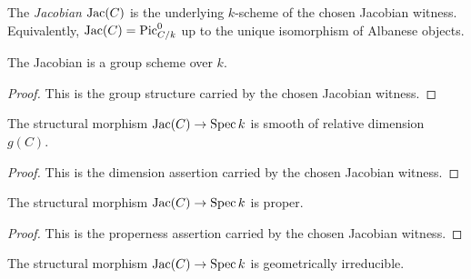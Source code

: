 \begin{definition}[Jacobian]
  \label{mk-def:Jacobian}

  The \emph{Jacobian} \(\mathrm{Jac}(C)\) is the underlying \(k\)-scheme of the
  chosen Jacobian witness.  Equivalently, \(\mathrm{Jac}(C)=\operatorname{Pic}^0_{C/k}\) up to the
  unique isomorphism of Albanese objects.
\end{definition}

\begin{theorem}
  \label{mk-thm:Jacobian_grpObj}

  The Jacobian is a group scheme over \(k\).
\end{theorem}

\begin{proof}
  This is the group structure carried by the chosen Jacobian witness.
\end{proof}

\begin{theorem}
  \label{mk-thm:Jacobian_smooth_genus}

  The structural morphism \(\mathrm{Jac}(C)\to\operatorname{Spec} k\) is smooth of relative
  dimension \(g(C)\).
\end{theorem}

\begin{proof}
  This is the dimension assertion carried by the chosen Jacobian witness.
\end{proof}

\begin{theorem}[Properness]
  \label{mk-thm:Jacobian_proper}

  The structural morphism \(\mathrm{Jac}(C)\to\operatorname{Spec} k\) is proper.
\end{theorem}

\begin{proof}
  This is the properness assertion carried by the chosen Jacobian witness.
\end{proof}

\begin{theorem}
  \label{mk-thm:Jacobian_geomIrred}

  The structural morphism \(\mathrm{Jac}(C)\to\operatorname{Spec} k\) is geometrically irreducible.
\end{theorem}

